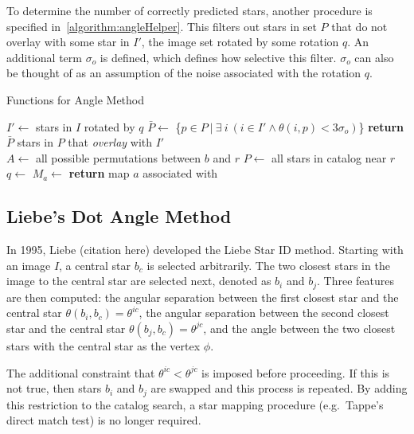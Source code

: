 To determine the number of correctly predicted stars, another procedure is specified in~\autoref{algorithm:angleHelper}.
This filters out stars in set $P$ that do not overlay with some star in $I'$, the image set rotated by some rotation
$q$.
An additional term $\sigma_o$ is defined, which defines how selective this filter.
$\sigma_o$ can also be thought of as an assumption of the noise associated with the rotation $q$.

\begin{algorithm}
    \caption{Functions for Angle Method}\label{algorithm:angleHelper}
    \begin{algorithmic}[1]
        \State $I' \gets$ stars in $I$ rotated by $q$
        \State $\bar{P} \gets $ \{$p \in P \ | \ \exists \ i \ (i \in I' \land \theta (i, p) < 3\sigma_o)$\}
        \State \textbf{return} $\bar{P}$ \Comment stars in $P$ that \textit{overlay} with $I'$
        \EndFunction
        \\
        \State $A \gets $ all possible permutations between $b$ and $r$
        \State $P \gets $ all stars in catalog near $r$
        \\
        \State $q \gets $ 
        \State $M_a \gets $ 
        \EndFor
        \State \textbf{return} map $a$ associated with 
        \EndFunction
    \end{algorithmic}
\end{algorithm}

\subsection{Liebe's Dot Angle Method}\label{subsec:liebe'sDotAngleMethod}
In 1995, Liebe (citation here) developed the Liebe Star ID method.
Starting with an image $I$, a central star $b_c$ is selected arbitrarily.
The two closest stars in the image to the central star are selected next, denoted as $b_i$ and $b_j$.
Three features are then computed: the angular separation between the first closest star and the central star $\theta
(b_i, b_c) = \theta^{ic}$, the angular separation between the second closest star and the central star $\theta (b_j,
b_c) = \theta^{jc}$, and the angle between the two closest stars with the central star as the vertex $\phi$.

The additional constraint that $\theta^{ic} < \theta^{jc}$ is imposed before proceeding.
If this is not true, then stars $b_i$ and $b_j$ are swapped and this process is repeated.
By adding this restriction to the catalog search, a star mapping procedure (e.g.\ Tappe's direct match test) is no
longer required.


